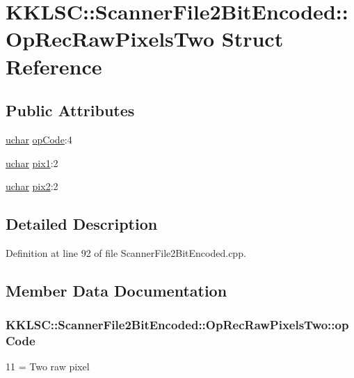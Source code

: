 \hypertarget{struct_scanner_file2_bit_encoded_1_1_op_rec_raw_pixels_two}{}\section{K\+K\+L\+SC\+:\+:Scanner\+File2\+Bit\+Encoded\+:\+:Op\+Rec\+Raw\+Pixels\+Two Struct Reference}
\label{struct_scanner_file2_bit_encoded_1_1_op_rec_raw_pixels_two}
\subsection*{Public Attributes}
\begin{DoxyCompactItemize}
\item 
\hyperlink{namespace_k_k_b_ace9969169bf514f9ee6185186949cdf7}{uchar} \hyperlink{struct_scanner_file2_bit_encoded_1_1_op_rec_raw_pixels_two_af88dd1aa5ed3e7c8d54cf2b6b6751540}{op\+Code}\+:4
\item 
\hyperlink{namespace_k_k_b_ace9969169bf514f9ee6185186949cdf7}{uchar} \hyperlink{struct_scanner_file2_bit_encoded_1_1_op_rec_raw_pixels_two_a7f94fe7299b496e66520797259a9269a}{pix1}\+:2
\item 
\hyperlink{namespace_k_k_b_ace9969169bf514f9ee6185186949cdf7}{uchar} \hyperlink{struct_scanner_file2_bit_encoded_1_1_op_rec_raw_pixels_two_abbe00413774e5dcefeab2a279930d5c2}{pix2}\+:2
\end{DoxyCompactItemize}


\subsection{Detailed Description}


Definition at line 92 of file Scanner\+File2\+Bit\+Encoded.\+cpp.



\subsection{Member Data Documentation}
\subsubsection[{\texorpdfstring{op\+Code}{opCode}}]{ K\+K\+L\+S\+C\+::\+Scanner\+File2\+Bit\+Encoded\+::\+Op\+Rec\+Raw\+Pixels\+Two\+::op\+Code}\hypertarget{struct_scanner_file2_bit_encoded_1_1_op_rec_raw_pixels_two_af88dd1aa5ed3e7c8d54cf2b6b6751540}{}\label{struct_scanner_file2_bit_encoded_1_1_op_rec_raw_pixels_two_af88dd1aa5ed3e7c8d54cf2b6b6751540}
11 = Two raw pixel 

